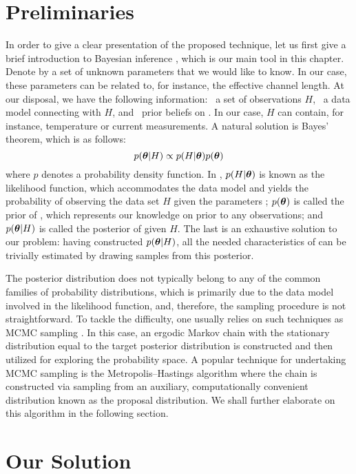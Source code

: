 \section{Preliminaries}

In order to give a clear presentation of the proposed technique, let us first
give a brief introduction to Bayesian inference \cite{gelman2004}, which is our
main tool in this chapter. Denote by \vt a set of unknown parameters that we
would like to know. In our case, these parameters can be related to, for
instance, the effective channel length. At our disposal, we have the following
information: \one~a set of observations $H$, \two~a data model connecting \vt
with $H$, and \three~prior beliefs on \vt. In our case, $H$ can contain, for
instance, temperature or current measurements. A natural solution is Bayes'
theorem, which is as follows:
\begin{equation} \elab{bayes-theorem}
  p(\vt | H) \propto p(H | \vt) p(\vt)
\end{equation}
where $p$ denotes a probability density function. In , $p(H
| \boldsymbol{\theta})$ is known as the likelihood function, which accommodates the data model
and yields the probability of observing the data set $H$ given the parameters
\vt; $p(\boldsymbol{\theta})$ is called the prior of \vt, which represents our knowledge on \vt
prior to any observations; and $p(\boldsymbol{\theta} | H)$ is called the posterior of \vt given
$H$. The last is an exhaustive solution to our problem: having constructed
$p(\boldsymbol{\theta} | H)$, all the needed characteristics of \vt can be trivially estimated
by drawing samples from this posterior.

The posterior distribution does not typically belong to any of the common
families of probability distributions, which is primarily due to the data model
involved in the likelihood function, and, therefore, the sampling procedure is
not straightforward. To tackle the difficulty, one usually relies on such
techniques as \ac{MCMC} sampling \cite{gelman2004}. In this case, an ergodic
Markov chain with the stationary distribution equal to the target posterior
distribution is constructed and then utilized for exploring the probability
space. A popular technique for undertaking \ac{MCMC} sampling is the
Metropolis--Hastings algorithm where the chain is constructed via sampling from
an auxiliary, computationally convenient distribution known as the proposal
distribution. We shall further elaborate on this algorithm in the following
section.

\section{Our Solution}

